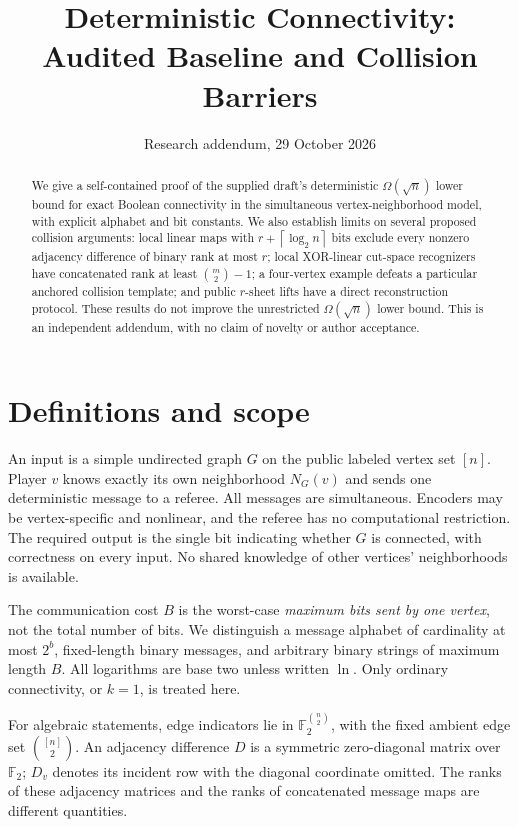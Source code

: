 \documentclass[11pt]{article}
\title{Deterministic Connectivity:\\Audited Baseline and Collision Barriers}
\author{}
\date{Research addendum, 29 October 2026}
\theoremstyle{remark}
\newcommand{\F}{\mathbb F_2}
\newcommand{\ceil}[1]{\left\lceil #1\right\rceil}
\begin{document}
\maketitle
\begin{abstract}
We give a self-contained proof of the supplied draft's deterministic
$\Omega(\sqrt n)$ lower bound for exact Boolean connectivity in the
simultaneous vertex-neighborhood model, with explicit alphabet and bit
constants. We also establish limits on several proposed collision arguments:
local linear maps with $r+\ceil{\log_2 n}$ bits exclude every nonzero
adjacency difference of binary rank at most $r$; local XOR-linear cut-space
recognizers have concatenated rank at least $\binom m2-1$; a four-vertex
example defeats a particular anchored collision template; and public
$r$-sheet lifts have a direct reconstruction protocol. These results do not
improve the unrestricted $\Omega(\sqrt n)$ lower bound. This is an
independent addendum, with no claim of novelty or author acceptance.
\end{abstract}

\section{Definitions and scope}

An input is a simple undirected graph $G$ on the public labeled vertex set
$[n]$. Player $v$ knows exactly its own neighborhood $N_G(v)$ and sends one
deterministic message to a referee. All messages are simultaneous. Encoders
may be vertex-specific and nonlinear, and the referee has no computational
restriction. The required output is the single bit indicating whether $G$
is connected, with correctness on every input. No shared knowledge of other
vertices' neighborhoods is available.

The communication cost $B$ is the worst-case \emph{maximum bits sent by one
vertex}, not the total number of bits. We distinguish a message alphabet of
cardinality at most $2^b$, fixed-length binary messages, and arbitrary binary
strings of maximum length $B$. All logarithms are base two unless written
$\ln$. Only ordinary connectivity, or $k=1$, is treated here.

For algebraic statements, edge indicators lie in
$\F^{\binom n2}$, with the fixed ambient edge set $\binom{[n]}2$.
An adjacency difference $D$ is a symmetric zero-diagonal matrix over $\F$;
$D_v$ denotes its incident row with the diagonal coordinate omitted.
The ranks of these adjacency matrices and the ranks of concatenated
message maps are different quantities.
\end{document}
